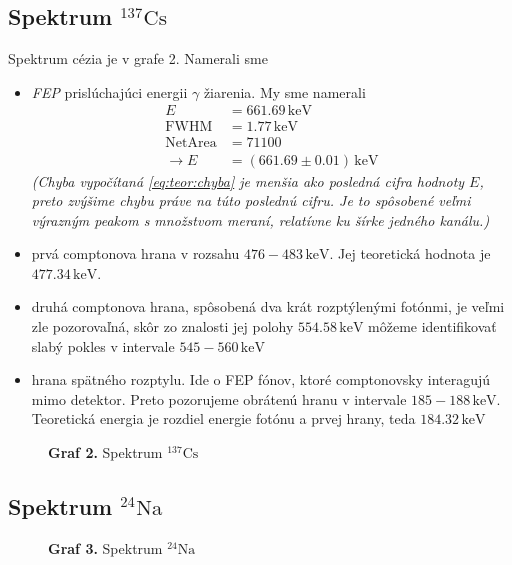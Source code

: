 \documentclass[a4paper, 10pt]{article}
\newcommand{\unit}[1]{\ensuremath{\, \mathrm{#1}}}
\begin{document}
\subsection*{Spektrum $^{137}\mathrm{Cs}$}
Spektrum cézia je v grafe 2. Namerali sme
\begin{itemize}
\item \textit{FEP} prislúchajúci energii $\gamma$ žiarenia. My sme namerali 
\begin{align*}
E &= 661.69\unit{keV}\\
\mathrm{FWHM} &= 1.77\unit{keV}\\
\mathrm{Net Area} &= 71100\\
\rightarrow E &= (661.69\pm 0.01)\unit {keV}
\end{align*}
\textit{(Chyba vypočítaná \ref{eq:teor:chyba} je menšia ako posledná cifra hodnoty $E$, preto zvýšime chybu práve na túto poslednú cifru. Je to spôsobené veľmi výrazným peakom s množstvom meraní, relatívne ku šírke jedného kanálu.)}

\item prvá comptonova hrana v rozsahu $476 - 483\unit{keV}$. Jej teoretická hodnota je $477.34\unit{keV}$.
\item druhá comptonova hrana, spôsobená dva krát rozptýlenými fotónmi, je veľmi zle pozorovaľná, skôr zo znalosti jej polohy $554.58\unit{keV}$ môžeme identifikovať slabý pokles v intervale \mbox{$545-560\unit{keV}$}
\item hrana spätného rozptylu. Ide o FEP fónov, ktoré comptonovsky interagujú mimo detektor. Preto pozorujeme obrátenú hranu v intervale $185-188\unit{keV}$. Teoretická energia je rozdiel energie fotónu a prvej hrany, teda $184.32\unit{keV}$
\end{itemize}

\begin{figure}[h!]
\centering

\textbf{Graf 2.} Spektrum $^{137}\mathrm{Cs}$
\end{figure}

\subsection*{Spektrum $^{24}\mathrm{Na}$}

\begin{figure}[h!]
\centering

\textbf{Graf 3.} Spektrum $^{24}\mathrm{Na}$
\end{figure}
\end{document}
